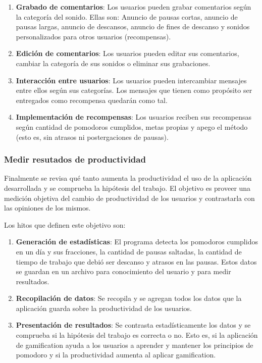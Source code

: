 \documentclass[12pt,letterpaper]{report}
\providecommand{\tightlist}{%
  \setlength{\itemsep}{0pt}\setlength{\parskip}{0pt}}
\begin{document}
\begin{enumerate}\tightlist{}
  \item \textbf{Grabado de comentarios}: Los usuarios pueden grabar comentarios según la categoría del sonido. Ellas
    son: Anuncio de pausas cortas, anuncio de pausas largas, anuncio de descansos, anuncio de fines de descanso y sonidos
    personalizados para otros usuarios (recompensas).
  \item \textbf{Edición de comentarios}: Los usuarios pueden editar sus comentarios, cambiar la categoría de sus sonidos
    o eliminar sus grabaciones.
  \item \textbf{Interacción entre usuarios}: Los usuarios pueden intercambiar mensajes entre ellos según sus categorías.
    Los mensajes que tienen como propósito ser entregados como recompensa quedarán como tal.
  \item \textbf{Implementación de recompensas}: Los usuarios reciben sus recompensas según cantidad de pomodoros cumplidos,
    metas propias y apego el método (esto es, sin atrasos ni postergaciones de pausas).
\end{enumerate}

\subsubsection{Medir resutados de productividad}\label{medir-resultados-de-productividad}

Finalmente se revisa qué tanto aumenta la productividad el uso de la aplicación desarrollada y se comprueba la hipótesis
del trabajo. El objetivo es proveer una medición objetiva del cambio de productividad de los usuarios y contrastarla con
las opiniones de los mismos.

Los hitos que definen este objetivo son:

\begin{enumerate}\tightlist{}
  \item \textbf{Generación de estadísticas}: El programa detecta los pomodoros cumplidos en un día y sus fracciones, la cantidad
    de pausas saltadas, la cantidad de tiempo de trabajo que debió ser descanso y atrasos en las pausas. Estos datos se
    guardan en un archivo para conocimiento del usuario y para medir resultados.
  \item \textbf{Recopilación de datos}: Se recopila y se agregan todos los datos que la aplicación guarda sobre la productividad
    de los usuarios.
  \item \textbf{Presentación de resultados}: Se contrasta estadísticamente los datos y se comprueba si la hipótesis del trabajo
    es correcta o no. Esto es, si la aplicación de gamification ayuda a los usuarios a aprender y mantener los
    principios de pomodoro y si la productividad aumenta al aplicar gamification.
\end{enumerate}
\end{document}
